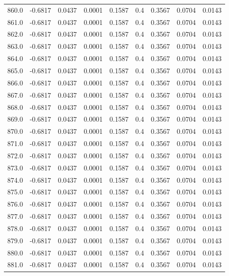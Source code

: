 \begin{longtable}{lrrrrrrrr}
860.0 & -0.6817 & 0.0437 & 0.0001 & 0.1587 & 0.4 & 0.3567 & 0.0704 & 0.0143 \\
861.0 & -0.6817 & 0.0437 & 0.0001 & 0.1587 & 0.4 & 0.3567 & 0.0704 & 0.0143 \\
862.0 & -0.6817 & 0.0437 & 0.0001 & 0.1587 & 0.4 & 0.3567 & 0.0704 & 0.0143 \\
863.0 & -0.6817 & 0.0437 & 0.0001 & 0.1587 & 0.4 & 0.3567 & 0.0704 & 0.0143 \\
864.0 & -0.6817 & 0.0437 & 0.0001 & 0.1587 & 0.4 & 0.3567 & 0.0704 & 0.0143 \\
865.0 & -0.6817 & 0.0437 & 0.0001 & 0.1587 & 0.4 & 0.3567 & 0.0704 & 0.0143 \\
866.0 & -0.6817 & 0.0437 & 0.0001 & 0.1587 & 0.4 & 0.3567 & 0.0704 & 0.0143 \\
867.0 & -0.6817 & 0.0437 & 0.0001 & 0.1587 & 0.4 & 0.3567 & 0.0704 & 0.0143 \\
868.0 & -0.6817 & 0.0437 & 0.0001 & 0.1587 & 0.4 & 0.3567 & 0.0704 & 0.0143 \\
869.0 & -0.6817 & 0.0437 & 0.0001 & 0.1587 & 0.4 & 0.3567 & 0.0704 & 0.0143 \\
870.0 & -0.6817 & 0.0437 & 0.0001 & 0.1587 & 0.4 & 0.3567 & 0.0704 & 0.0143 \\
871.0 & -0.6817 & 0.0437 & 0.0001 & 0.1587 & 0.4 & 0.3567 & 0.0704 & 0.0143 \\
872.0 & -0.6817 & 0.0437 & 0.0001 & 0.1587 & 0.4 & 0.3567 & 0.0704 & 0.0143 \\
873.0 & -0.6817 & 0.0437 & 0.0001 & 0.1587 & 0.4 & 0.3567 & 0.0704 & 0.0143 \\
874.0 & -0.6817 & 0.0437 & 0.0001 & 0.1587 & 0.4 & 0.3567 & 0.0704 & 0.0143 \\
875.0 & -0.6817 & 0.0437 & 0.0001 & 0.1587 & 0.4 & 0.3567 & 0.0704 & 0.0143 \\
876.0 & -0.6817 & 0.0437 & 0.0001 & 0.1587 & 0.4 & 0.3567 & 0.0704 & 0.0143 \\
877.0 & -0.6817 & 0.0437 & 0.0001 & 0.1587 & 0.4 & 0.3567 & 0.0704 & 0.0143 \\
878.0 & -0.6817 & 0.0437 & 0.0001 & 0.1587 & 0.4 & 0.3567 & 0.0704 & 0.0143 \\
879.0 & -0.6817 & 0.0437 & 0.0001 & 0.1587 & 0.4 & 0.3567 & 0.0704 & 0.0143 \\
880.0 & -0.6817 & 0.0437 & 0.0001 & 0.1587 & 0.4 & 0.3567 & 0.0704 & 0.0143 \\
881.0 & -0.6817 & 0.0437 & 0.0001 & 0.1587 & 0.4 & 0.3567 & 0.0704 & 0.0143 \\

\end{longtable}
